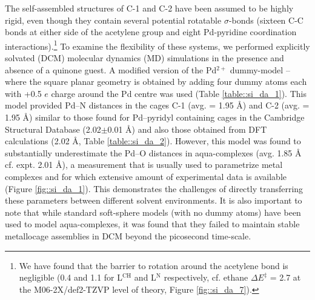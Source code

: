 \documentclass[../../main.tex]{subfiles}
\begin{document}
The self-assembled structures of C-1 and C-2 have been assumed to be highly rigid, even though they contain several potential rotatable $\sigma$-bonds (sixteen C-C bonds at either side of the acetylene group and eight Pd-pyridine coordination interactions).\footnote{We have found that the barrier to rotation around the acetylene bond is negligible (0.4 and 1.1 \kcalx for L${}^\text{CH}$ and L${}^\text{N}$ respectively, cf. ethane $\Delta E^\ddagger$ = 2.7 \kcalx at the M06-2X/def2-TZVP level of theory, Figure \ref{fig::si_da_7}).} To examine the flexibility of these systems, we performed explicitly solvated (DCM) molecular dynamics (MD) simulations in the presence and absence of a quinone guest. A modified version of the Pd${}^{2+}$ dummy-model – where the square planar geometry is obtained by adding four dummy atoms each with +0.5 $e$ charge around the Pd centre was used (Table \ref{table::si_da_1}).\cite{Duarte2014} This model provided Pd–N distances in the cages C-1 (avg. = 1.95 \AA) and C-2 (avg. = 1.95 \AA) similar to those found for Pd–pyridyl containing cages in the Cambridge Structural Database (2.02$\pm$0.01 \AA)\cite{Lewis2012, August2016} and also those obtained from DFT calculations (2.02 \AA, Table \ref{table::si_da_2}). However, this model was found to substantially underestimate the Pd–O distances in aqua-complexes (avg. 1.85 \AA$\;$ cf. expt.\cite{Persson2010} 2.01 \AA), a measurement that is usually used to parametrize metal complexes and for which extensive amount of experimental data is available (Figure \ref{fig::si_da_1}).\cite{Li2017} This demonstrates the challenges of directly transferring these parameters between different solvent environments. It is also important to note that while standard soft-sphere models (with no dummy atoms) have been used to model aqua-complexes, it was found that they failed to maintain stable metallocage assemblies in DCM beyond the picosecond time-scale. 
\end{document}
